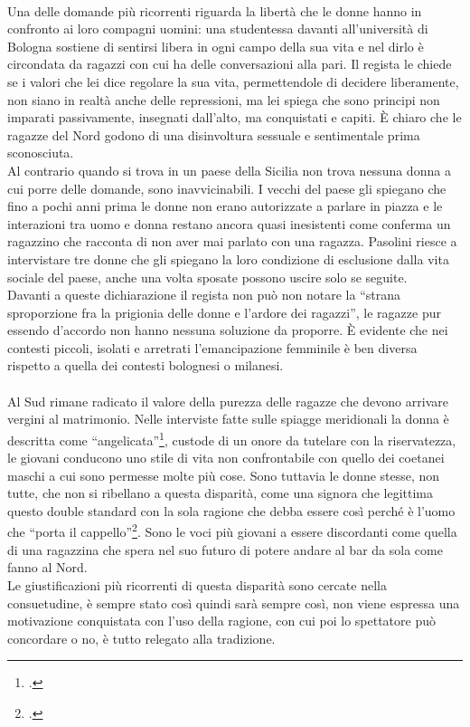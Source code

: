\paragraph{}Una delle domande più ricorrenti riguarda la libertà che le donne hanno in confronto ai loro compagni uomini: una studentessa davanti all'università di Bologna sostiene di sentirsi libera in ogni campo della sua vita e nel dirlo è circondata da ragazzi con cui ha delle conversazioni alla pari.
Il regista le chiede se i valori che lei dice regolare la sua vita, permettendole di decidere liberamente, non siano in realtà anche delle repressioni, ma lei spiega che sono principi non imparati passivamente, insegnati dall'alto, ma conquistati e capiti.
È chiaro che le ragazze del Nord godono di una disinvoltura sessuale e sentimentale prima sconosciuta.
\\Al contrario quando si trova in un paese della Sicilia non trova nessuna donna a cui porre delle domande, sono inavvicinabili.
I vecchi del paese gli spiegano che fino a pochi anni prima le donne non erano autorizzate a parlare in piazza e le interazioni tra uomo e donna restano ancora quasi inesistenti come conferma un ragazzino che racconta di non aver mai parlato con una ragazza.
Pasolini riesce a intervistare tre donne che gli spiegano la loro condizione di esclusione dalla vita sociale del paese, anche una volta sposate possono uscire solo se seguite.
\\Davanti a queste dichiarazione il regista non può non notare la \enquote{strana sproporzione fra la prigionia delle donne e l'ardore dei ragazzi}, le ragazze pur essendo d'accordo non hanno nessuna soluzione da proporre.
È evidente che nei contesti piccoli, isolati e arretrati l'emancipazione femminile è ben diversa rispetto a quella dei contesti bolognesi o milanesi.

\paragraph{}Al Sud rimane radicato il valore della purezza delle ragazze che devono arrivare vergini al matrimonio.
Nelle interviste fatte sulle spiagge meridionali la donna è descritta come \enquote{angelicata}\footcite{Comizi}, custode di un onore da tutelare con la riservatezza, le giovani conducono uno stile di vita non confrontabile con quello dei coetanei maschi a cui sono permesse molte più cose.
Sono tuttavia le donne stesse, non tutte, che non si ribellano a questa disparità, come una signora che legittima questo double standard con la sola ragione che debba essere così perché è l'uomo che \enquote{porta il cappello}\footcite{Comizi}.
Sono le voci più giovani a essere discordanti come quella di una ragazzina che spera nel suo futuro di potere andare al bar da sola come fanno al Nord.
\\Le giustificazioni più ricorrenti di questa disparità sono cercate nella consuetudine, è sempre stato così quindi sarà sempre così, non viene espressa una motivazione conquistata con l'uso della ragione, con cui poi lo spettatore può concordare o no, è tutto relegato alla tradizione.

